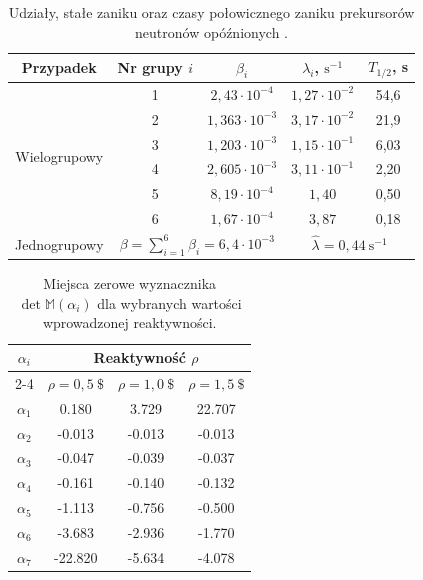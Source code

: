  
\begin{table}[H]
	\centering
	\caption{Udziały, stałe zaniku oraz czasy połowicznego zaniku prekursorów neutronów opóźnionych \cite{kubowski}.}
	\label{tab2}
	\renewcommand{\arraystretch}{1.2}
	\begin{tabular}{|c|c|c|c|c|}
		\hline
		Przypadek & Nr grupy $i$ & $\beta_i$ & $\lambda_i$, $\mathrm{s^{-1}}$ & $T_{1/2}$, s \\
		\hline
		\multirow{6}{*}{Wielogrupowy}
		& 1 & $2{,}43 \cdot 10^{-4}$ & $1{,}27 \cdot 10^{-2}$ & 54{,}6 \\
		& 2 & $1{,}363 \cdot 10^{-3}$ & $3{,}17 \cdot 10^{-2}$ & 21{,}9 \\
		& 3 & $1{,}203 \cdot 10^{-3}$ & $1{,}15 \cdot 10^{-1}$ & 6{,}03 \\
		& 4 & $2{,}605 \cdot 10^{-3}$ & $3{,}11 \cdot 10^{-1}$ & 2{,}20 \\
		& 5 & $8{,}19 \cdot 10^{-4}$ & $1{,}40$ & 0{,}50 \\
		& 6 & $1{,}67 \cdot 10^{-4}$ & $3{,}87$ & 0{,}18 \\
		\hline
		Jednogrupowy
		& \multicolumn{2}{c|}{$\beta = \sum\limits_{i=1}^{6} \beta_i = 6{,}4 \cdot 10^{-3}$}
		& \multicolumn{2}{c|}{$\hat{\lambda} = 0{,}44~\mathrm{s^{-1}}$} \\
		\hline
	\end{tabular}
\end{table}



\begin{table}[H]
	\centering
	\caption{Miejsca zerowe wyznacznika $\det\mathbb{M}(\alpha_i)$ dla wybranych wartości wprowadzonej reaktywności.}
	\label{tab1}
	\renewcommand{\arraystretch}{1.2}
	\begin{tabular}{|c|c|c|c|}
		\hline
		\multirow{2}{*}{$\alpha_i$} &
		\multicolumn{3}{c|}{Reaktywność $\rho$} \\ \cline{2-4}
		& $\rho = 0{,}5~\$$ & $\rho = 1{,}0~\$$ & $\rho = 1{,}5~\$$ \\
		\hline
		$\alpha_1$ & 0.180  & 3.729  & 22.707 \\
		$\alpha_2$ & -0.013 & -0.013 & -0.013 \\
		$\alpha_3$ & -0.047 & -0.039 & -0.037 \\
		$\alpha_4$ & -0.161 & -0.140 & -0.132 \\
		$\alpha_5$ & -1.113 & -0.756 & -0.500 \\
		$\alpha_6$ & -3.683 & -2.936 & -1.770 \\
		$\alpha_7$ & -22.820& -5.634 & -4.078 \\
		\hline
	\end{tabular}
\end{table}

